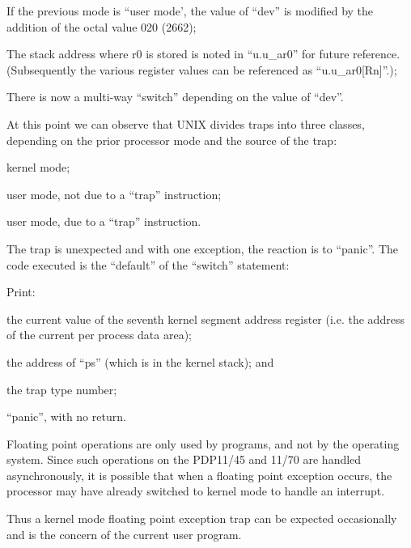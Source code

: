 \item[2700:] If the previous mode is ``user
 mode', the value of ``dev'' is
 modified by the addition of the
 octal value 020 (2662);

\item[2701:] The stack address where r0 is
 stored is noted in ``u.u\_ar0'' for
 future reference. (Subsequently
the various register values can
be referenced as ``u.u\_ar0[Rn]''.);

\item[2702:] There is now a multi-way ``switch''
 depending on the value of ``dev''.
\ed

At this point we can observe that UNIX
divides traps into three classes,
depending on the prior processor mode
and the source of the trap:

\bd
\item[(a)] kernel mode;

\item[(b)] user mode, not due to a ``trap''
 instruction;

\item[(c)] user mode, due to a ``trap''
 instruction.
\ed



The trap is unexpected and with one
exception, the reaction is to ``panic''.
The code executed is the ``default'' of
the ``switch'' statement:

\bd
\item[2716:] Print:

\bi
\item the current value of the seventh
kernel segment address register
(i.e. the address of the current
per process data area);

\item the address of ``ps'' (which is in
the kernel stack); and

\item the trap type number;
\ei

\item[2719:] ``panic'', with no return.
\ed

Floating point operations are only used
by programs, and not by the operating
system. Since such operations on the
PDP11/45 and 11/70 are handled asynchronously, it is possible that when a
floating point exception occurs, the
processor may have already switched to
kernel mode to handle an interrupt.

Thus a kernel mode floating point
exception trap can be expected occasionally and is the concern of the
current user program.

